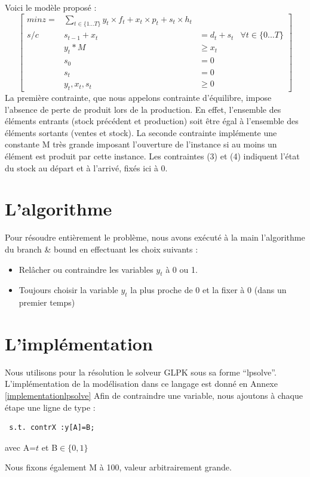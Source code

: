 \documentclass[a4paper,11pt,twoside]{report}
\begin{document}
Voici le modèle proposé :
\[
 \left[ \begin{matrix}
         min z= & \displaystyle \sum_{t\in \{1...T\}} y_t \times f_t + x_t \times p_t + s_t \times h_t \\
         s/c & s_{t-1}+x_{t}& =d_t+s_t & \forall t\in \{0...T\} \\
         & y_t*M &\geq x_t \\
         &s_0&=0\\
         &s_t&=0\\
         &y_t,x_t,s_t&\geq 0
        \end{matrix}
 \right]
\]
La première contrainte, que nous appelons contrainte d'équilibre, impose l'absence de perte de produit lors de la production. En effet, l'ensemble des éléments entrants (stock précédent et production) soit être égal à l'ensemble des éléments sortants (ventes et stock).
La seconde contrainte implémente une constante M très grande imposant l'ouverture de l'instance si au moins un élément est produit par cette instance.
Les contraintes (3) et (4) indiquent l'état du stock au départ et à l'arrivé, fixés ici à 0.

\section{L'algorithme}
Pour résoudre entièrement le problème, nous avons exécuté à la main l'algorithme du branch \& bound en effectuant les choix suivants :
\begin{itemize}
 \item Relâcher ou contraindre les variables $y_t$ à 0 ou 1.
 \item Toujours choisir la variable $y_t$ la plus proche de 0 et la fixer à 0 (dans un premier temps)
\end{itemize}

\section{L'implémentation}
Nous utilisons pour la résolution le solveur GLPK sous sa forme ``lpsolve''. L'implémentation de la modélisation dans ce langage est donné en Annexe \ref{implementationlpsolve}
Afin de contraindre une variable, nous ajoutons à chaque étape une ligne de type :
\begin{verbatim}
 s.t. contrX :y[A]=B;
\end{verbatim}
 avec A=$t$ et B$\in \{0,1\}$
 
 Nous fixons également M à 100, valeur arbitrairement grande.
\end{document}
